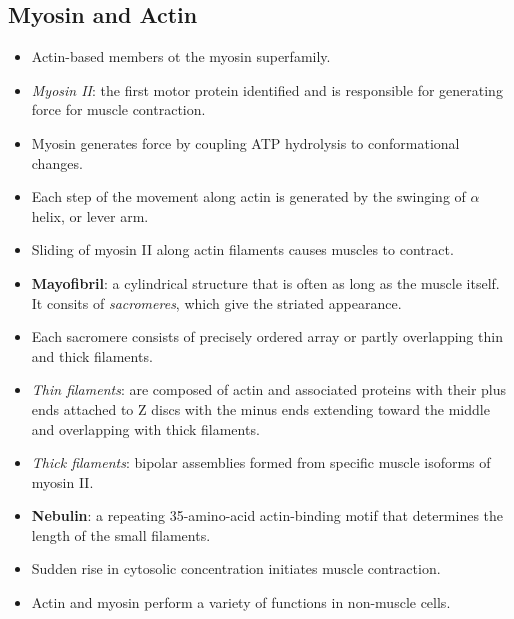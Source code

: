 \documentclass[12pt,a4paper]{article}
\begin{document}
\subsection{Myosin and Actin}
\begin{itemize}
    \item Actin-based members ot the myosin superfamily.
    \item \textit{Myosin II}: the first motor protein identified and is responsible for generating force for muscle contraction.
    \item Myosin generates force by coupling ATP hydrolysis to conformational changes.
    \item Each step of the movement along actin is generated by the swinging of $\alpha$ helix, or lever arm.
    \item Sliding of myosin II along actin filaments causes muscles to contract.
    \item \textbf{Mayofibril}: a cylindrical structure that is often as long as the muscle itself. It consits of \textit{sacromeres}, which give the striated appearance.
    \item Each sacromere consists of precisely ordered array or partly overlapping thin and thick filaments.
    \item \textit{Thin filaments}: are composed of actin and associated proteins with their plus ends attached to Z discs with the minus ends extending toward the middle and overlapping with thick filaments. 
    \item \textit{Thick filaments}: bipolar assemblies formed from specific muscle isoforms of myosin II. 
    \item \textbf{Nebulin}: a repeating 35-amino-acid actin-binding motif that determines the length of the small filaments.
    \item Sudden rise in cytosolic  concentration initiates muscle contraction.
    \item Actin and myosin perform a variety of functions in non-muscle cells.
\end{itemize}
\end{document}
